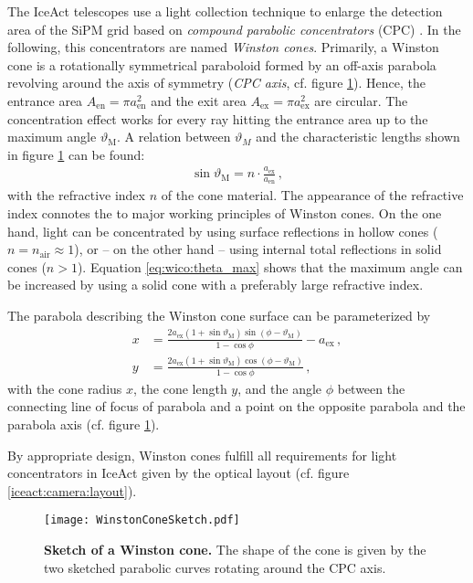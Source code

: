 The IceAct telescopes use a light collection technique to enlarge the detection area of the SiPM grid based on \textit{compound parabolic concentrators} (CPC) \cite{wico:book}. In the following, this concentrators are named \textit{Winston cones}. 
Primarily, a Winston cone is a rotationally symmetrical paraboloid formed by an off-axis parabola revolving around the axis of symmetry (\textit{CPC axis}, cf. figure \ref{iceact:camera:wico_sketch}). Hence, the entrance area $A_\text{en}=\pi a_\text{en}^2$ and the exit area $A_\text{ex}=\pi a_\text{ex}^2$ are circular. The concentration effect works for every ray hitting the entrance area up to the maximum angle $\vartheta_\text{M}$. A relation between $\vartheta_M$ and the characteristic lengths shown in figure \ref{iceact:camera:wico_sketch} can be found: \cite{wico:book,iceact:camera}
\begin{align}
	\sin\vartheta_\text{M} = n\cdot\frac{a_\text{ex}}{a_\text{en}}\,,
	\label{eq:wico:theta_max}
\end{align}
with the refractive index $n$ of the cone material. The appearance of the refractive index connotes the to major working principles of Winston cones. On the one hand, light can be concentrated by using surface reflections in hollow cones ($n=n_\text{air}\approx 1$), or -- on the other hand -- using internal total reflections in solid cones ($n>1$). Equation \eqref{eq:wico:theta_max} shows that the maximum angle can be increased by using a solid cone with a preferably large refractive index.

The parabola describing the Winston cone surface can be parameterized by \cite{wico:book,iceact:camera}
\begin{align}
	x &= \frac{2a_\text{ex}(1+\sin\vartheta_\text{M})\sin(\phi-\vartheta_\text{M})}{1-\cos\phi}-a_\text{ex}\,,\\
	y &= \frac{2a_\text{ex}(1+\sin\vartheta_\text{M})\cos(\phi-\vartheta_\text{M})}{1-\cos\phi}\,,
\end{align}
with the cone radius $x$, the cone length $y$, and the angle $\phi$ between the connecting line of focus of parabola and a point on the opposite parabola and the parabola axis (cf. figure \ref{iceact:camera:wico_sketch}).

By appropriate design, Winston cones fulfill all requirements for light concentrators in IceAct given by the optical layout (cf. figure \ref{iceact:camera:layout}).


\begin{figure}
	\centering
	\texttt{[image: WinstonConeSketch.pdf]}
	\caption[Sketch of a Winston cone]{\textbf{Sketch of a Winston cone.} \cite{iceact:camera} The shape of the cone is given by the two sketched parabolic curves rotating around the CPC axis. }
	\label{iceact:camera:wico_sketch}	
\end{figure}

